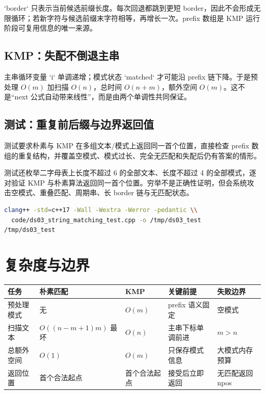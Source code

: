 \documentclass[UTF8,fontset=none,11pt,a4paper]{ctexart}
\begin{document}
`border` 只表示当前候选前缀长度。每次回退都跳到更短 border，因此不会形成无限循环；若新字符与候选前缀末字符相等，再增长一次。prefix 数组是 KMP 运行阶段可复用信息的唯一来源。

\subsection{KMP：失配不倒退主串}


主串循环变量 `i` 单调递增；模式状态 `matched` 才可能沿 prefix 链下降。于是预处理 $O(m)$ 加扫描 $O(n)$，总时间 $O(n+m)$，额外空间 $O(m)$。这不是“next 公式自动带来线性”，而是由两个单调性共同保证。

\subsection{测试：重复前后缀与边界返回值}


测试要求朴素与 KMP 在多组文本/模式上返回同一首个位置，直接检查 prefix 数组的重复结构，并覆盖空模式、模式过长、完全无匹配和失配后仍有答案的情形。

测试还枚举二字母表上长度不超过 6 的全部文本、长度不超过 4 的全部模式，逐对验证 KMP 与朴素算法返回同一首个位置。穷举不是正确性证明，但会系统攻击空模式、重叠匹配、周期串、长 border 链与无匹配状态。

\begin{lstlisting}[language=bash]
clang++ -std=c++17 -Wall -Wextra -Werror -pedantic \\
  code/ds03_string_matching_test.cpp -o /tmp/ds03_test
/tmp/ds03_test
\end{lstlisting}

\section{复杂度与边界}
\begin{center}\small
\begin{tabularx}{\linewidth}{L{2.5cm}C{1.8cm}C{1.8cm}YY}
\toprule
任务 & 朴素匹配 & KMP & 关键前提 & 失败边界\\
\midrule
预处理模式 & 无 & $O(m)$ & prefix 语义固定 & 空模式\\
扫描文本 & $O((n-m+1)m)$ 最坏 & $O(n)$ & 主串下标单调前进 & $m>n$\\
总额外空间 & $O(1)$ & $O(m)$ & 只保存模式信息 & 大模式内存预算\\
返回位置 & 首个合法起点 & 首个合法起点 & 接受后立即返回 & 无匹配返回 npos\\
\bottomrule
\end{tabularx}
\end{center}
\end{document}
